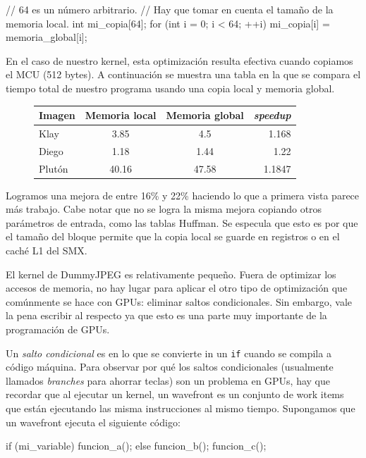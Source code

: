 \label{alg:gpgpu-memcpy}
\begin{code}[language=C][h]
    // 64 es un número arbitrario.
    // Hay que tomar en cuenta el tamaño de la memoria local.
    int mi_copia[64];
    for (int i = 0; i < 64; ++i) {
        mi_copia[i] = memoria_global[i];
    }
\end{code}

En el caso de nuestro kernel, esta optimización resulta efectiva cuando
copiamos el MCU (512 bytes). A continuación se muestra una tabla en la que se
compara el tiempo total de nuestro programa usando una copia local y memoria
global.

\begin{figure}[h]
    \begin{tabular}{ |l c c r| }
        \hline
        Imagen & Memoria local & Memoria global & \emph{speedup} \\
        \hline
        Klay & 3.85 & 4.5 & 1.168 \\
        Diego & 1.18 & 1.44 & 1.22 \\
        Plutón & 40.16 & 47.58 & 1.1847 \\
        \hline
    \end{tabular}
\end{figure}

Logramos una mejora de entre 16\% y 22\% haciendo lo que a primera vista parece
más trabajo. Cabe notar que no se logra la misma mejora copiando otros
parámetros de entrada, como las tablas Huffman. Se especula que esto es por que
el tamaño del bloque permite que la copia local se guarde en registros o en el
caché L1 del SMX.

El kernel de DummyJPEG es relativamente pequeño. Fuera de optimizar los accesos
de memoria, no hay lugar para aplicar el otro tipo de optimización que
comúnmente se hace con GPUs: eliminar saltos condicionales. Sin embargo, vale
la pena escribir al respecto ya que esto es una parte muy importante de la
programación de GPUs.

Un \emph{ salto condicional } es en lo que se convierte in un \verb+if+ cuando
se compila a código máquina. Para observar por qué los saltos condicionales
(usualmente llamados \emph{branches} para ahorrar teclas) son un problema en
GPUs, hay que recordar que al ejecutar un kernel, un wavefront es un conjunto
de work items que están ejecutando las misma instrucciones al mismo tiempo.
Supongamos que un wavefront ejecuta el siguiente código:

\begin{code}[language=C][h]
    if (mi_variable) {
        funcion_a();
    } else {
        funcion_b();
    }
    funcion_c();
\end{code}

